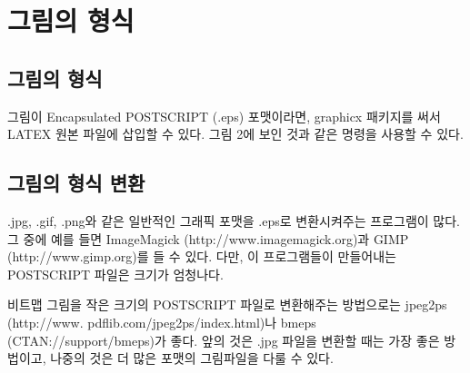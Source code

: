 %
%
\newpage
\section{그림의 형식}

		\subsection{그림의 형식}
			
				그림이 Encapsulated POSTSCRIPT (.eps) 포맷이라면, graphicx 패키지를 써서 LATEX 원본 파일에
				삽입할 수 있다. 그림 2에 보인 것과 같은 명령을 사용할 수 있다.
		
		
		\subsection{그림의 형식 변환}
		
				.jpg, .gif, .png와 같은 일반적인 그래픽 포맷을 .eps로 변환시켜주는 프로그램이 많다. 그 중에
				예를 들면 ImageMagick (http://www.imagemagick.org)과 GIMP (http://www.gimp.org)를 들 수
				있다. 다만, 이 프로그램들이 만들어내는 POSTSCRIPT 파일은 크기가 엄청나다.
				
				비트맵 그림을 작은 크기의 POSTSCRIPT 파일로 변환해주는 방법으로는 jpeg2ps (http://www.
				pdflib.com/jpeg2ps/index.html)나 bmeps (CTAN://support/bmeps)가 좋다. 
				앞의 것은 .jpg 파일을 변환할 때는 가장 좋은 방법이고, 나중의 것은 더 많은 포맷의 그림파일을 다룰 수 있다.
		
